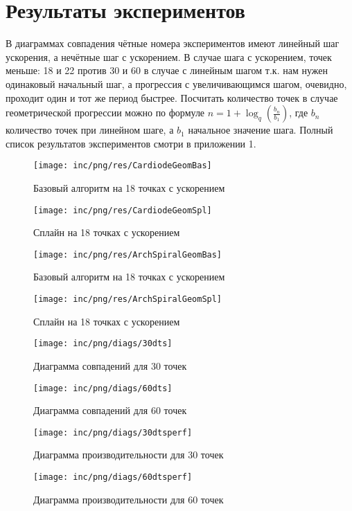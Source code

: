 \section{Результаты экспериментов}
В диаграммах совпадения чётные номера экспериментов имеют линейный шаг ускорения, а нечётные шаг с ускорением. В случае шага с ускорением, точек меньше: 18 и 22 против 30 и 60 в случае с линейным шагом т.к. нам нужен одинаковый начальный шаг, а прогрессия с увеличивающимся шагом, очевидно, проходит один и тот же период быстрее. Посчитать количество точек в случае геометрической прогрессии можно по формуле $n=1+\log_{q}(\frac{b_n}{b_1})$, где $b_n$ количество точек при линейном шаге, а $b_1$ начальное значение шага. Полный список результатов экспериментов смотри в приложении 1.
\begin{figure}
	\begin{minipage}{0.45\textwidth}
		\texttt{[image: inc/png/res/CardiodeGeomBas]}
		\caption{Базовый алгоритм на 18 точках с ускорением}
		\label{fig:res1}
	\end{minipage}
	\begin{minipage}{0,45\textwidth}
		\texttt{[image: inc/png/res/CardiodeGeomSpl]}
		\caption{Сплайн на 18 точках с ускорением}
		\label{fig:res2}
	\end{minipage}
	\begin{minipage}{0.45\textwidth}
		\texttt{[image: inc/png/res/ArchSpiralGeomBas]}
		\caption{Базовый алгоритм на 18 точках с ускорением}
		\label{fig:res3}
	\end{minipage}
	\begin{minipage}{0,45\textwidth}
		\texttt{[image: inc/png/res/ArchSpiralGeomSpl]}
		\caption{Сплайн на 18 точках с ускорением}
		\label{fig:res4}
	\end{minipage}
\end{figure}
\clearpage
\begin{figure}
	\centering
	\texttt{[image: inc/png/diags/30dts]}
	\caption{Диаграмма совпадений для 30 точек}
	\label{fig:diag1}
	\texttt{[image: inc/png/diags/60dts]}
	\caption{Диаграмма совпадений для 60 точек}
	\label{fig:diag2}
\end{figure}

\begin{figure}
	\centering
	\texttt{[image: inc/png/diags/30dtsperf]}
	\caption{Диаграмма производительности для 30 точек}
	\label{fig:diag3}
\end{figure}
\begin{figure}
	\centering
	\texttt{[image: inc/png/diags/60dtsperf]}
	\caption{Диаграмма производительности для 60 точек}
	\label{fig:diag4}
\end{figure}
\clearpage

